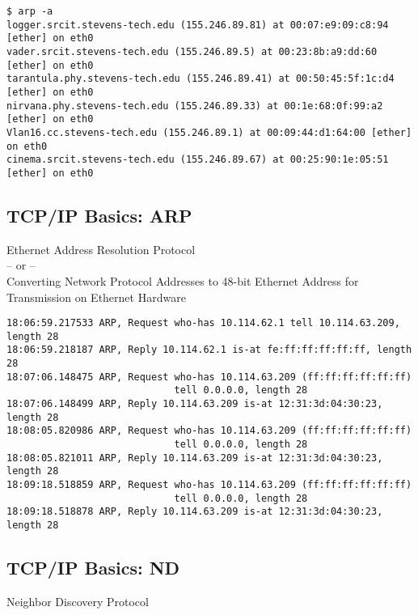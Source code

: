 \documentclass[xga]{xdvislides}
\begin{document}
\begin{verbatim}
$ arp -a
logger.srcit.stevens-tech.edu (155.246.89.81) at 00:07:e9:09:c8:94 [ether] on eth0
vader.srcit.stevens-tech.edu (155.246.89.5) at 00:23:8b:a9:dd:60 [ether] on eth0
tarantula.phy.stevens-tech.edu (155.246.89.41) at 00:50:45:5f:1c:d4 [ether] on eth0
nirvana.phy.stevens-tech.edu (155.246.89.33) at 00:1e:68:0f:99:a2 [ether] on eth0
Vlan16.cc.stevens-tech.edu (155.246.89.1) at 00:09:44:d1:64:00 [ether] on eth0
cinema.srcit.stevens-tech.edu (155.246.89.67) at 00:25:90:1e:05:51 [ether] on eth0
\end{verbatim}

\subsection{TCP/IP Basics: ARP}
\begin{center}
Ethernet Address Resolution Protocol \\
-- or -- \\
Converting Network Protocol Addresses to 48-bit Ethernet Address for Transmission on Ethernet Hardware
\end{center}
\vspace{.2in}

\begin{verbatim}
18:06:59.217533 ARP, Request who-has 10.114.62.1 tell 10.114.63.209, length 28
18:06:59.218187 ARP, Reply 10.114.62.1 is-at fe:ff:ff:ff:ff:ff, length 28
18:07:06.148475 ARP, Request who-has 10.114.63.209 (ff:ff:ff:ff:ff:ff)
                             tell 0.0.0.0, length 28
18:07:06.148499 ARP, Reply 10.114.63.209 is-at 12:31:3d:04:30:23, length 28
18:08:05.820986 ARP, Request who-has 10.114.63.209 (ff:ff:ff:ff:ff:ff)
                             tell 0.0.0.0, length 28
18:08:05.821011 ARP, Reply 10.114.63.209 is-at 12:31:3d:04:30:23, length 28
18:09:18.518859 ARP, Request who-has 10.114.63.209 (ff:ff:ff:ff:ff:ff)
                             tell 0.0.0.0, length 28
18:09:18.518878 ARP, Reply 10.114.63.209 is-at 12:31:3d:04:30:23, length 28
\end{verbatim}

\subsection{TCP/IP Basics: ND}
\begin{center}
Neighbor Discovery Protocol
\end{center}
\vspace{.2in}
\end{document}
